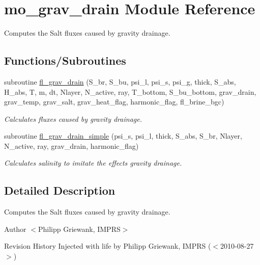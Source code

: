 \hypertarget{namespacemo__grav__drain}{
\section{mo\_\-grav\_\-drain Module Reference}
\label{namespacemo__grav__drain}
}


Computes the Salt fluxes caused by gravity drainage.  


\subsection*{Functions/Subroutines}
\begin{DoxyCompactItemize}
\item 
subroutine \hyperlink{namespacemo__grav__drain_a13446b857aa40114998fffc35b90489d}{fl\_\-grav\_\-drain} (S\_\-br, S\_\-bu, psi\_\-l, psi\_\-s, psi\_\-g, thick, S\_\-abs, H\_\-abs, T, m, dt, Nlayer, N\_\-active, ray, T\_\-bottom, S\_\-bu\_\-bottom, grav\_\-drain, grav\_\-temp, grav\_\-salt, grav\_\-heat\_\-flag, harmonic\_\-flag, fl\_\-brine\_\-bgc)
\begin{DoxyCompactList}\small\item\em Calculates fluxes caused by gravity drainage. \item\end{DoxyCompactList}\item 
subroutine \hyperlink{namespacemo__grav__drain_acfbe9a1ea75d02f8e3e85a1f6aeb0ea3}{fl\_\-grav\_\-drain\_\-simple} (psi\_\-s, psi\_\-l, thick, S\_\-abs, S\_\-br, Nlayer, N\_\-active, ray, grav\_\-drain, harmonic\_\-flag)
\begin{DoxyCompactList}\small\item\em Calculates salinity to imitate the effects gravity drainage. \item\end{DoxyCompactList}\end{DoxyCompactItemize}


\subsection{Detailed Description}
Computes the Salt fluxes caused by gravity drainage. \begin{DoxyAuthor}{Author}
$<$Philipp Griewank, IMPRS$>$
\end{DoxyAuthor}
\begin{DoxyParagraph}{Revision History}
Injected with life by Philipp Griewank, IMPRS ($<$2010-\/08-\/27$>$) 
\end{DoxyParagraph}


